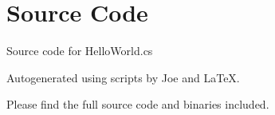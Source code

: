 \documentclass[12pt]{article}
\begin{document}
\maketitle
\pagebreak


\section{Source Code}

Source code for \textsf{HelloWorld.cs}


\newpage



\newpage

Autogenerated using scripts by Joe and \LaTeX.

Please find the full source code and binaries included.
\end{document}
